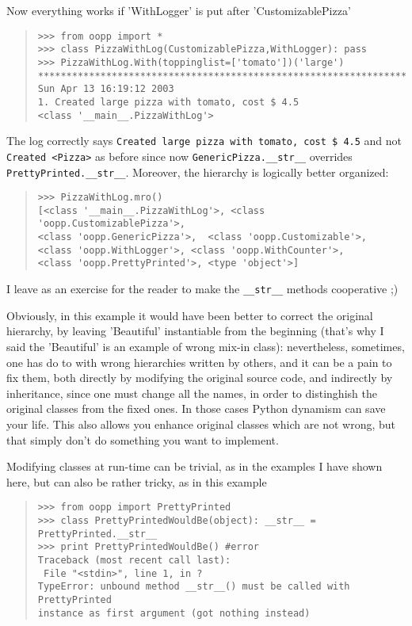 \documentclass[10pt,english]{article}
\begin{document}
Now everything works if 'WithLogger' is put after 'CustomizablePizza'
\begin{quote}
\begin{verbatim}>>> from oopp import *
>>> class PizzaWithLog(CustomizablePizza,WithLogger): pass 
>>> PizzaWithLog.With(toppinglist=['tomato'])('large')
****************************************************************************
Sun Apr 13 16:19:12 2003
1. Created large pizza with tomato, cost $ 4.5
<class '__main__.PizzaWithLog'>\end{verbatim}
\end{quote}

The log correctly  says \texttt{Created large pizza with tomato, cost {\$} 4.5} and not
\texttt{Created <Pizza>} as before since now \texttt{GenericPizza.{\_}{\_}str{\_}{\_}}
overrides \texttt{PrettyPrinted.{\_}{\_}str{\_}{\_}}. Moreover, the hierarchy is logically
better organized:
\begin{quote}
\begin{verbatim}>>> PizzaWithLog.mro()
[<class '__main__.PizzaWithLog'>, <class 'oopp.CustomizablePizza'>, 
<class 'oopp.GenericPizza'>,  <class 'oopp.Customizable'>, 
<class 'oopp.WithLogger'>, <class 'oopp.WithCounter'>, 
<class 'oopp.PrettyPrinted'>, <type 'object'>]\end{verbatim}
\end{quote}

I leave as an exercise for the reader to make the \texttt{{\_}{\_}str{\_}{\_}} methods
cooperative ;)

Obviously, in this example it would have been better to correct the
original hierarchy, by leaving 'Beautiful' instantiable from the beginning
(that's why I said the 'Beautiful' is an example of wrong mix-in class): 
nevertheless, sometimes, one has do to with wrong hierarchies written by 
others, and it can be a pain to fix them, both directly by modifying the 
original source code, and indirectly
by inheritance, since one must change all the names, in order to distinghish
the original classes from the fixed ones. In those cases Python
dynamism can save your life. This also allows you enhance original
classes which are not wrong, but that simply don't do something you want
to implement.

Modifying classes at run-time can be trivial, as in the examples I have
shown here, but can also be rather tricky, as in this example
\begin{quote}
\begin{verbatim}>>> from oopp import PrettyPrinted
>>> class PrettyPrintedWouldBe(object): __str__ = PrettyPrinted.__str__
>>> print PrettyPrintedWouldBe() #error
Traceback (most recent call last):
 File "<stdin>", line 1, in ?
TypeError: unbound method __str__() must be called with PrettyPrinted 
instance as first argument (got nothing instead)\end{verbatim}
\end{quote}
\end{document}
